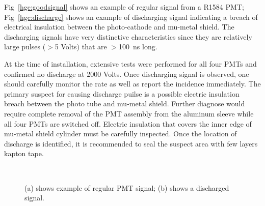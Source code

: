 
Fig~\ref{hgc:goodsignal} shows an example of regular signal from a
R1584 PMT; Fig~\ref{hgc:discharge} shows an example of discharging
signal indicating a breach of electrical insulation between the
photo-cathode and mu-metal shield. The discharging signals have very
distinctive characteristics since they are relatively large pulses
($>$5 Volts) that are $>$100~ns long.

At the time of installation, extensive tests were performed for all
four PMTs and confirmed no discharge at 2000 Volts. Once discharging
signal is observed, one should carefully monitor the rate as well as
report the incidence immediately. The primary suspect for causing
discharge puilse is a possible electric insulation breach between the
photo tube and mu-metal shield. Further diagnose would require
complete removal of the PMT assembly from the aluminum sleeve while
all four PMTs are switched off. Electric insulation that covers the
inner edge of mu-metal shield cylinder must be carefully
inspected. Once the location of discharge is identified, it is
recommended to seal the suspect area with few layers kapton tape.







\begin{figure}
     \centering
     ~
     \caption{(a) shows example of regular PMT signal; (b) shows a discharged signal.}
     \label{hgc:signal}
\end{figure}


% 
% 
% 






